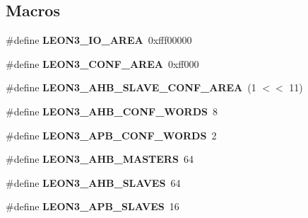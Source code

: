 \subsection*{Macros}
\begin{DoxyCompactItemize}
\item 
\mbox{\label{group__RTEMSBSPsSPARCLEON3AMBA_ga99a7f9cd37e9a508d20501530bdfaffc}} 
\#define {\bfseries L\+E\+O\+N3\+\_\+\+I\+O\+\_\+\+A\+R\+EA}~0xfff00000
\item 
\mbox{\label{group__RTEMSBSPsSPARCLEON3AMBA_ga185f1987c55e63e1a3249ab9793734d7}} 
\#define {\bfseries L\+E\+O\+N3\+\_\+\+C\+O\+N\+F\+\_\+\+A\+R\+EA}~0xff000
\item 
\mbox{\label{group__RTEMSBSPsSPARCLEON3AMBA_ga8d99c99bef38550a4d1c37796335598b}} 
\#define {\bfseries L\+E\+O\+N3\+\_\+\+A\+H\+B\+\_\+\+S\+L\+A\+V\+E\+\_\+\+C\+O\+N\+F\+\_\+\+A\+R\+EA}~(1 $<$$<$ 11)
\item 
\mbox{\label{group__RTEMSBSPsSPARCLEON3AMBA_ga62bd4a524c87f95c925666b3d66464b2}} 
\#define {\bfseries L\+E\+O\+N3\+\_\+\+A\+H\+B\+\_\+\+C\+O\+N\+F\+\_\+\+W\+O\+R\+DS}~8
\item 
\mbox{\label{group__RTEMSBSPsSPARCLEON3AMBA_ga7add2d1d15945020960710b703813832}} 
\#define {\bfseries L\+E\+O\+N3\+\_\+\+A\+P\+B\+\_\+\+C\+O\+N\+F\+\_\+\+W\+O\+R\+DS}~2
\item 
\mbox{\label{group__RTEMSBSPsSPARCLEON3AMBA_gacb7fb73703ab7f870d15264db56ec47a}} 
\#define {\bfseries L\+E\+O\+N3\+\_\+\+A\+H\+B\+\_\+\+M\+A\+S\+T\+E\+RS}~64
\item 
\mbox{\label{group__RTEMSBSPsSPARCLEON3AMBA_gaa8045009eef34f87c87f067f69e3f3ea}} 
\#define {\bfseries L\+E\+O\+N3\+\_\+\+A\+H\+B\+\_\+\+S\+L\+A\+V\+ES}~64
\item 
\mbox{\label{group__RTEMSBSPsSPARCLEON3AMBA_ga34dcedbe96c88edc933741d271b94f20}} 
\#define {\bfseries L\+E\+O\+N3\+\_\+\+A\+P\+B\+\_\+\+S\+L\+A\+V\+ES}~16
\end{DoxyCompactItemize}
